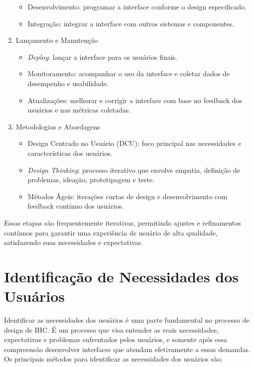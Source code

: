\documentclass[
  12pt,
  openright,
  twoside,
  a4paper,
  english,
  french,
  spanish,
  brazil
]{abntex2}
\begin{document}
\begin{enumerate}
  \begin{itemize}
    \item Desenvolvimento: programar a interface conforme o design especificado.
    \item Integração: integrar a interface com outros sistemas e componentes.
  \end{itemize}
  \item Lançamento e Manutenção
  \begin{itemize}
    \item \textit{Deploy}: lançar a interface para os usuários finais.
    \item
      Monitoramento: acompanhar o uso da interface e coletar dados de desempenho
      e usabilidade.
    \item
      Atualizações: melhorar e corrigir a interface com base no feedback dos
      usuários e nas métricas coletadas.
  \end{itemize}
  \item Metodologias e Abordagens
  \begin{itemize}
    \item
      Design Centrado no Usuário (DCU): foco principal nas necessidades e
      características dos usuários.
    \item
      \textit{Design Thinking}: processo iterativo que envolve empatia,
      definição de problemas, ideação, prototipagem e teste.
    \item
      Métodos Ágeis: iterações curtas de design e desenvolvimento com feedback
      contínuo dos usuários.
  \end{itemize}
\end{enumerate}

Essas etapas são frequentemente iterativas, permitindo ajustes e refinamentos
contínuos para garantir uma experiência de usuário de alta qualidade,
satisfazendo suas necessidades e expectativas.

\section{Identificação de Necessidades dos Usuários}

Identificar as necessidades dos usuários é uma parte fundamental no processo de
design de IHC. É um processo que visa entender as reais necessidades,
expectativas e problemas enfrentados pelos usuários, e somente após essa
compreensão desenvolver interfaces que atendam efetivamente a essas demandas. Os
principais métodos para identificar as necessidades dos usuários são:
\end{document}
